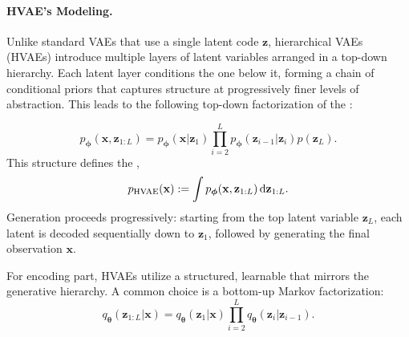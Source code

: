 \paragraph{HVAE's Modeling.}
Unlike standard VAEs that use a single latent code $\mathbf{z}$, hierarchical VAEs (HVAEs) introduce multiple layers of latent variables arranged in a top-down hierarchy.  
Each latent layer conditions the one below it, forming a chain of conditional priors that captures structure at progressively finer levels of abstraction.  
This leads to the following top-down factorization of the :

\[
p_{\bm{\phi}}(\mathbf{x}, \mathbf{z}_{1:L}) = p_{\bm{\phi}}(\mathbf{x} | \mathbf{z}_1) \prod_{i=2}^{L} p_{\bm{\phi}}(\mathbf{z}_{i-1}|\mathbf{z}_i)   p(\mathbf{z}_L).
\]
This structure defines the ,
\[
p_{\text{HVAE}}(\mathbf{x}) := \int p_{\bm{\phi}}(\mathbf{x}, \mathbf{z}_{1:L}) \mathop{}\!\mathrm{d} \mathbf{z}_{1:L}.
\]
 Generation proceeds progressively: starting from the top latent variable $ \mathbf{z}_L $, each latent is decoded sequentially down to $ \mathbf{z}_1 $, followed by generating the final observation $ \mathbf{x} $.

For encoding part, HVAEs utilize a structured, learnable  that mirrors the generative hierarchy. A common choice is a bottom-up Markov factorization:
\[
q_{\bm{\theta}}(\mathbf{z}_{1:L} | \mathbf{x}) = q_{\bm{\theta}}(\mathbf{z}_1 | \mathbf{x}) \prod_{i=2}^{L} q_{\bm{\theta}}(\mathbf{z}_i | \mathbf{z}_{i-1}).
\]

